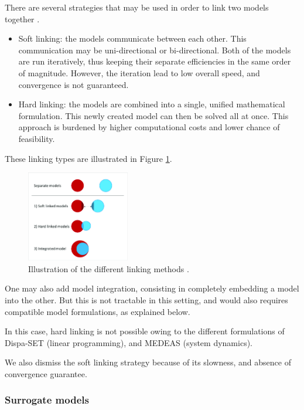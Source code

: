 There are several strategies that may be used in order to link two models together \cite{linkings-stuff}.

\begin{itemize}
    \item Soft linking: the models communicate between each other. This communication may be uni-directional or bi-directional. Both of the models are run iteratively, thus keeping their separate efficiencies in the same order of magnitude. However, the iteration lead to low overall speed, and convergence is not guaranteed.
    \item Hard linking: the models are combined into a single, unified mathematical formulation. This newly created model can then be solved all at once. This approach is burdened by higher computational costs and lower chance of feasibility.
\end{itemize}

These linking types are illustrated in Figure \ref{fig:linking-types}.

\begin{figure}[h]
    \centering
    \includegraphics[width=0.4\textwidth]{resources/images/hybrid_model_variants.png}
    \caption{Illustration of the different linking methods \cite{hybrid_models}.}
    \label{fig:linking-types}
\end{figure}

One may also add model integration, consisting in completely embedding a model into the other. But this is not tractable in this setting, and would also requires compatible model formulations, as explained below.

In this case, hard linking is not possible owing to the different formulations of Dispa-SET (linear programming), and MEDEAS (system dynamics).

We also dismiss the soft linking strategy because of its slowness, and absence of convergence guarantee.

\subsubsection{Surrogate models}

